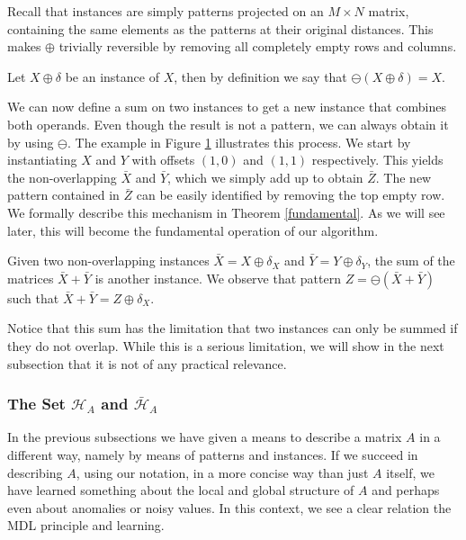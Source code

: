 \documentclass{llncs}
\begin{document}
Recall that instances are simply patterns projected on an $M\times N$ matrix, containing the same elements as the patterns at their original distances. This makes $\oplus$ trivially reversible by removing all completely empty rows and columns.

\begin{definition}
Let $X \oplus \delta$ be an instance of $X$, then by definition we say that $\ominus(X \oplus \delta) = X$.
\end{definition}

We can now define a sum on two instances to get a new instance that combines both operands. Even though the result is not a pattern, we can always obtain it by using $\ominus$. The example in Figure \ref{example2} illustrates this process. We start by instantiating $X$ and $Y$ with offsets $(1,0)$ and $(1,1)$ respectively. This yields the non-overlapping $\bar{X}$ and $\bar{Y}$, which we simply add up to obtain $\bar{Z}$. The new pattern contained in $\bar{Z}$ can be easily identified by removing the top empty row. We formally describe this mechanism in Theorem \ref{fundamental}. As we will see later, this will become the fundamental operation of our algorithm.

\begin{figure}


\label{example2}
\end{figure}

\begin{theorem}\label{fundamental}
Given two non-overlapping instances $\bar{X}=X\oplus \delta_X$ and $\bar{Y}=Y\oplus \delta_Y$, the sum of the matrices $\bar{X} + \bar{Y}$ is another instance. We observe that pattern $Z=\ominus(\bar{X} + \bar{Y})$ such that $\bar{X} + \bar{Y} = Z\oplus \delta_X$.
\end{theorem}

Notice that this sum has the limitation that two instances can only be summed if they do not overlap. While this is a serious limitation, we will show in the next subsection that it is not of any practical relevance.


\subsubsection{The Set $\mathcal{H}_A$ and $\bar{\mathcal{H}}_A$}\label{thesetH}

In the previous subsections we have given a means to describe a matrix $A$ in a different way, namely by means of patterns and instances. If we succeed in describing $A$, using our notation, in a more concise way than just $A$ itself, we have learned something about the local and global structure of $A$ and perhaps even about anomalies or noisy values. In this context, we see a clear relation the MDL principle and learning. 
\end{document}

